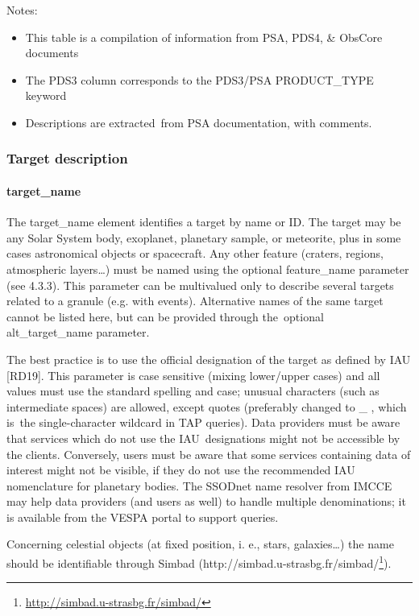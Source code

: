 \documentclass[11pt,a4paper]{ivoa}
\begin{document}
Notes:

\begin{itemize}
\item This table is a compilation of information from PSA, PDS4, \& ObsCore documents
\item The PDS3 column corresponds to the PDS3/PSA PRODUCT\_TYPE keyword
\item Descriptions are extracted from PSA documentation, with comments.
\end{itemize}

\subsubsection{Target description}

\paragraph{target\_name}

The target\_name element identifies a target by name or ID. The target may be any Solar System body, exoplanet, planetary sample, or meteorite, plus in some cases astronomical objects or spacecraft. Any other feature (craters, regions, atmospheric layers…) must be named using the optional feature\_name parameter (see 4.3.3). This parameter can be multivalued only to describe several targets related to a granule (e.g. with events). Alternative names of the same target cannot be listed here, but can be provided through the optional alt\_target\_name parameter. 

The best practice is to use the official designation of the target as defined by IAU [RD19]. This parameter is case sensitive (mixing lower/upper cases) and all values must use the standard spelling and case; unusual characters (such as intermediate spaces) are allowed, except quotes (preferably changed to \_ , which is the single-character wildcard in TAP queries). Data providers must be aware that services which do not use the IAU designations might not be accessible by the clients. Conversely, users must be aware that some services containing data of interest might not be visible, if they do not use the recommended IAU nomenclature for planetary bodies. The SSODnet name resolver from IMCCE may help data providers (and users as well) to handle multiple denominations; it is available from the VESPA portal to support queries.

Concerning celestial objects (at fixed position, i. e., stars, galaxies…) the name should be identifiable through Simbad (http://simbad.u-strasbg.fr/simbad/\footnote{\url{http://simbad.u-strasbg.fr/simbad/}}).
\end{document}
